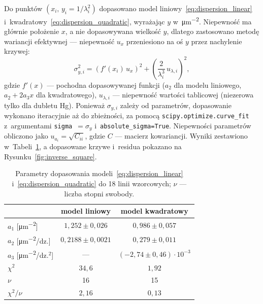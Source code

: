 \documentclass[12pt, a4paper]{article}
\begin{document}
Do punktów $(x_i,\, y_i = 1/\lambda_i^2)$ dopasowano model liniowy~\eqref{eq:dispersion_linear}
i~kwadratowy~\eqref{eq:dispersion_quadratic}, wyrażając $y$ w~\si{\micro\meter^{-2}}.
Niepewność ma głównie położenie $x$, a nie dopasowywana wielkość $y$, dlatego zastosowano
metodę wariancji efektywnej --- niepewność $u_x$ przeniesiono na oś $y$ przez nachylenie
krzywej:
\begin{equation}
    \sigma_{y,i}^2 = \left(f'(x_i)\, u_x\right)^2 + \left(\frac{2}{\lambda_i^3}\, u_{\lambda,i}\right)^2,
    \label{eq:effective_variance}
\end{equation}
gdzie $f'(x)$ --- pochodna dopasowywanej funkcji ($a_2$ dla modelu liniowego,
$a_2 + 2a_3x$ dla kwadratowego), $u_{\lambda,i}$ --- niepewność wartości tablicowej
(niezerowa tylko dla dubletu Hg). Ponieważ $\sigma_{y,i}$ zależy od parametrów,
dopasowanie wykonano iteracyjnie aż do zbieżności, za pomocą
\texttt{scipy.optimize.curve\_fit} z~argumentami \texttt{sigma}~$= \sigma_y$
i~\texttt{absolute\_sigma=True}. Niepewności parametrów obliczono jako
$u_{a_i} = \sqrt{C_{ii}}$, gdzie $C$ --- macierz kowariancji. Wyniki zestawiono
w~Tabeli~\ref{tab:fit_params}, a dopasowane krzywe i~residua pokazano na
Rysunku~\ref{fig:inverse_square}.

\begin{table}[H]
    \centering
    \caption{Parametry dopasowania modeli~\eqref{eq:dispersion_linear}
             i~\eqref{eq:dispersion_quadratic} do 18 linii wzorcowych;
             $\nu$ --- liczba stopni swobody.}\label{tab:fit_params}
    \begin{tabular}{l c c}
        \toprule
        & model liniowy & model kwadratowy \\
        \midrule
        $a_1$ [\si{\micro\meter^{-2}}]        & $1{,}252 \pm 0{,}026$   & $0{,}986 \pm 0{,}057$ \\
        $a_2$ [\si{\micro\meter^{-2}}/dz.]    & $0{,}2188 \pm 0{,}0021$ & $0{,}279 \pm 0{,}011$ \\
        $a_3$ [\si{\micro\meter^{-2}}/dz.$^2$] & ---                    & $(-2{,}74 \pm 0{,}46)\cdot 10^{-3}$ \\
        $\chi^2$                              & $34{,}6$                & $1{,}92$ \\
        $\nu$                                 & 16                      & 15 \\
        $\chi^2/\nu$                          & $2{,}16$                & $0{,}13$ \\
        \bottomrule
    \end{tabular}
\end{table}
\end{document}
